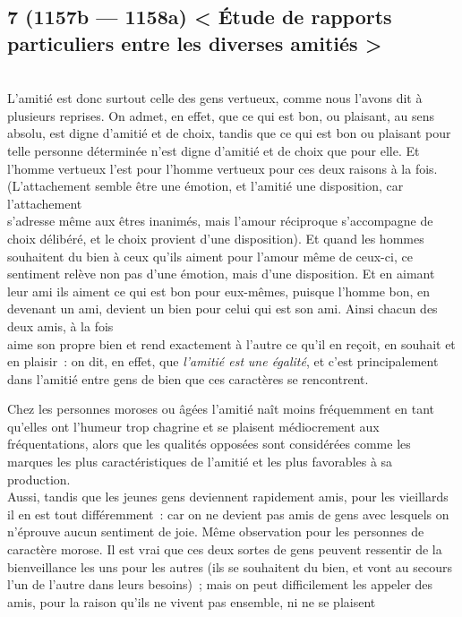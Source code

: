\documentclass[french,twoside]{book} %
\begin{document}
\subsection[{7 (1157b — 1158a) < Étude de rapports particuliers entre les diverses amitiés >}]{7 (1157b — 1158a) < Étude de rapports particuliers entre les diverses amitiés >}
\noindent \\
L’amitié est donc surtout celle des gens vertueux, comme nous l’avons dit à plusieurs reprises. On admet, en effet, que ce qui est bon, ou plaisant, au sens absolu, est digne d’amitié et de choix, tandis que ce qui est bon ou plaisant pour telle personne déterminée n’est digne d’amitié et de choix que pour elle. Et l’homme vertueux l’est pour l’homme vertueux pour ces deux raisons à la fois. (L’attachement semble être une émotion, et l’amitié une disposition, car l’attachement \\
s’adresse même aux êtres inanimés, mais l’amour réciproque s’accompagne de choix délibéré, et le choix provient d’une disposition). Et quand les hommes souhaitent du bien à ceux qu’ils aiment pour l’amour même de ceux-ci, ce sentiment relève non pas d’une émotion, mais d’une disposition. Et en aimant leur ami ils aiment ce qui est bon pour eux-mêmes, puisque l’homme bon, en devenant un ami, devient un bien pour celui qui est son ami. Ainsi chacun des deux amis, à la fois \\
aime son propre bien et rend exactement à l’autre ce qu’il en reçoit, en souhait et en plaisir : on dit, en effet, que {\itshape l’amitié est}  {\itshape une égalité}, et c’est principalement dans l’amitié entre gens de bien que ces caractères se rencontrent.\par
Chez les personnes moroses ou âgées l’amitié naît moins fréquemment en tant qu’elles ont l’humeur trop chagrine et se plaisent médiocrement aux fréquentations, alors que les qualités opposées sont considérées comme les marques les plus caractéristiques de l’amitié et les plus favorables à sa production. \\
Aussi, tandis que les jeunes gens deviennent rapidement amis, pour les vieillards il en est tout différemment : car on ne devient pas amis de gens avec lesquels on n’éprouve aucun sentiment de joie. Même observation pour les personnes de caractère morose. Il est vrai que ces deux sortes de gens peuvent ressentir de la bienveillance les uns pour les autres (ils se souhaitent du bien, et vont au secours l’un de l’autre dans leurs besoins) ; mais on peut difficilement les appeler des amis, pour la raison qu’ils ne vivent pas ensemble, ni ne se plaisent \\
\end{document}
